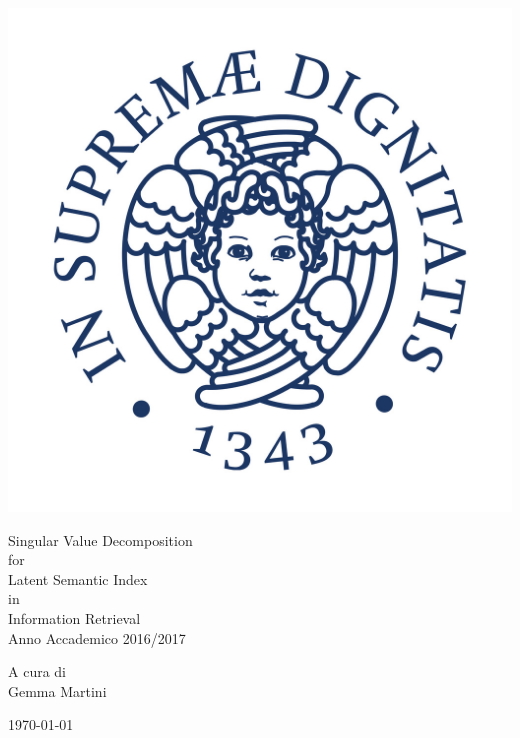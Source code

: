 \documentclass[12pt,a4paper]{article}
\theoremstyle{thm}
\theoremstyle{def}
\begin{document}
\begin{titlepage}
\begin{center}
\vspace{3cm}

\begin{center}
\includegraphics[scale=0.3]{Cherubino.jpg}
\end{center}

\vspace{1cm}
\Huge
{\sc Singular Value Decomposition}\\
for\\
{\sc Latent Semantic Index}\\
in\\
{\sc Information Retrieval}\\
\Large
Anno Accademico 2016/2017\\

\vspace{1.5cm}

\Large
A cura di\\
{\sc Gemma Martini}\\

\vspace{1.5cm}

\today

\vfill

\end{center}
\end{titlepage}
\end{document}
